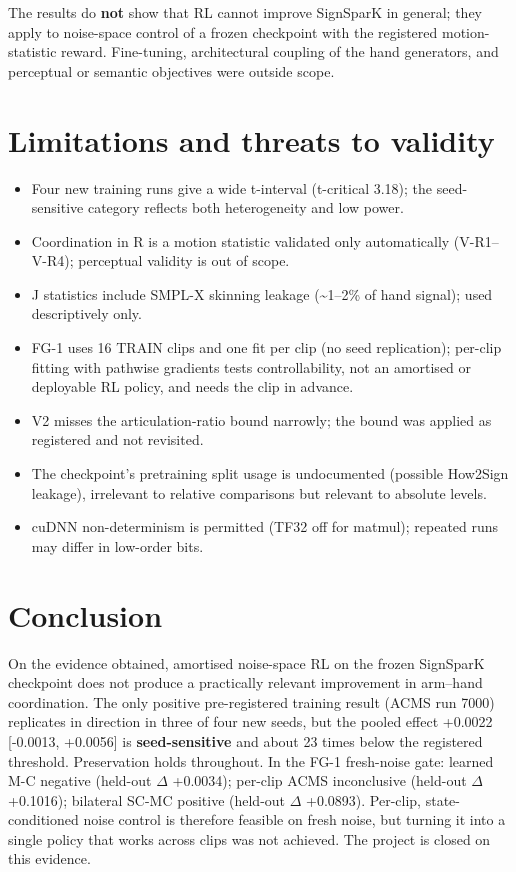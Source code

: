 \documentclass[conference]{IEEEtran}
\begin{document}
The results do \textbf{not} show that RL cannot improve SignSparK in general; they apply to noise-space control of a frozen checkpoint with the registered motion-statistic reward. Fine-tuning, architectural coupling of the hand generators, and perceptual or semantic objectives were outside scope.

\section{Limitations and threats to validity}
\begin{itemize}\item Four new training runs give a wide t-interval (t-critical 3.18); the seed-sensitive category reflects both heterogeneity and low power.\item Coordination in R is a motion statistic validated only automatically (V-R1--V-R4); perceptual validity is out of scope.\item J statistics include SMPL-X skinning leakage (\textasciitilde{}1--2\% of hand signal); used descriptively only.\item FG-1 uses 16 TRAIN clips and one fit per clip (no seed replication); per-clip fitting with pathwise gradients tests controllability, not an amortised or deployable RL policy, and needs the clip in advance.\item V2 misses the articulation-ratio bound narrowly; the bound was applied as registered and not revisited.\item The checkpoint's pretraining split usage is undocumented (possible How2Sign leakage), irrelevant to relative comparisons but relevant to absolute levels.\item cuDNN non-determinism is permitted (TF32 off for matmul); repeated runs may differ in low-order bits.\end{itemize}
\section{Conclusion}
On the evidence obtained, amortised noise-space RL on the frozen SignSparK checkpoint does not produce a practically relevant improvement in arm--hand coordination. The only positive pre-registered training result (ACMS run 7000) replicates in direction in three of four new seeds, but the pooled effect +0.0022 [-0.0013, +0.0056] is \textbf{seed-sensitive} and about 23 times below the registered threshold. Preservation holds throughout. In the FG-1 fresh-noise gate: learned M-C negative (held-out $\Delta$ +0.0034); per-clip ACMS inconclusive (held-out $\Delta$ +0.1016); bilateral SC-MC positive (held-out $\Delta$ +0.0893). Per-clip, state-conditioned noise control is therefore feasible on fresh noise, but turning it into a single policy that works across clips was not achieved. The project is closed on this evidence.
\end{document}
